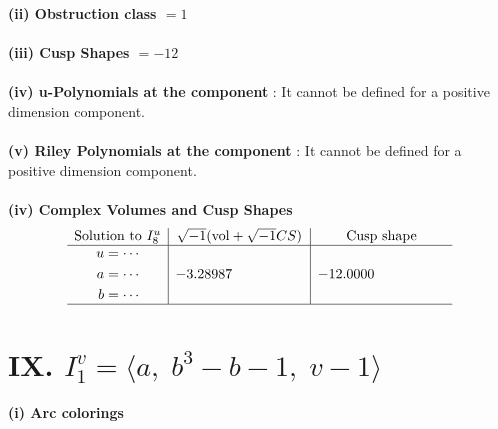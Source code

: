 \documentclass[1p]{elsarticle_modified}
\theoremstyle{definition}
\newcommand{\I}{\sqrt{-1}}
\begin{document}
\flushleft \textbf{(ii) Obstruction class $= 1$}\\~\\
\flushleft \textbf{(iii) Cusp Shapes $= -12$}\\~\\
\flushleft \textbf{(iv) u-Polynomials at the component} : It cannot be defined for a positive dimension component.\\~\\
\flushleft \textbf{(v) Riley Polynomials at the component} : It cannot be defined for a positive dimension component.\\~\\
\newpage\flushleft \textbf{(iv) Complex Volumes and Cusp Shapes}
$$\begin{array}{c|c|c} 
\text{Solution to }I^u_{8}& \I (\text{vol} + \sqrt{-1}CS) & \text{Cusp shape}\\
 \hline 
\begin{aligned}
u &= \cdots \\
a &= \cdots \\
b &= \cdots\end{aligned}
 & -3.28987\phantom{ +0.000000I} & -12.0000\phantom{ +0.000000I}\\
 \hline 
 \end{array}
$$\newpage\renewcommand{\arraystretch}{1}
\centering \section*{IX. $I^v_{1}= \langle a,\;b^3- b-1,\;v-1 \rangle$}
\flushleft \textbf{(i) Arc colorings}\\
\end{document}
